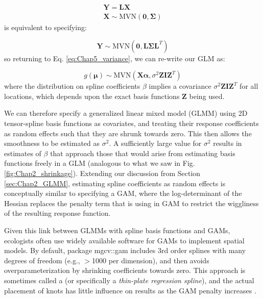 \begin{equation}
\begin{gathered}
    \mathbf{Y} = \mathbf{LX} \\
    \mathbf{X} \sim \mathrm{MVN}(\mathbf{0},\mathbf{\Sigma}) 
\end{gathered}
\end{equation}
is equivalent to specifying:

\begin{equation}
    \mathbf{Y} \sim \mathrm{MVN}(\mathbf{0},\mathbf{L \Sigma} \mathbf{L}^T)     
\end{equation}
so returning to Eq. \ref{eq:Chap5_variance}, we can re-write our GLM as:

\begin{equation}
    g(\mathbf{\mu}) \sim \mathrm{MVN}(\mathbf{X\alpha},\sigma^2 \mathbf{Z} \mathbf{I} \mathbf{Z}^T)
\end{equation}
where the distribution on spline coefficients \(\beta\) implies a covariance \( \sigma^2 \mathbf{Z} \mathbf{I} \mathbf{Z}^T \) for all locations, which depends upon the exact basis functions \(\mathbf{Z}\) being used.

We can therefore specify a generalized linear mixed model (GLMM) using 2D tensor-spline basis functions as covariates, and treating their response coefficients as random effects such that they are shrunk towards zero.  This then allows the smoothness to be estimated as \(\sigma^2\). A sufficiently large value for \(\sigma^2\) results in estimates of \(\beta\) that approach those that would arise from estimating basis functions freely in a GLM (analogous to what we saw in Fig. \ref{fig:Chap2_shrinkage}).  Extending our discussion from Section \ref{sec:Chap2_GLMM}, estimating spline coefficients as random effects is conceptually similar to specifying a GAM, where the log-determinant of the Hessian replaces the penalty term that is using in GAM to restrict the wiggliness of the resulting response function.  

Given this link between GLMMs with spline basis functions and GAMs, ecologists often use widely available software for GAMs to implement spatial models. By default, package \colorbox{backcolour}{mgcv::gam} includes 3rd order splines with many degrees of freedom (e.g., $>$1000 per dimension), and then avoids overparameterization by shrinking coefficients towards zero.  This approach is sometimes called a  (or specifically a \textit{thin-plate regression spline}), and the actual placement of knots has little influence on results as the GAM penalty increases \cite{wood_thin_2003}.  


